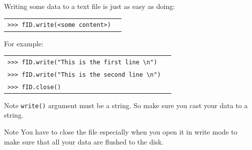 \documentclass[t,handout,9pt]{beamer}
\begin{document}
\begin{frame}
\vfill
Writing some data to a text file is just as easy as doing:
\begin{table}[]
\begin{flushleft}
\begin{tabular}{ll}
\texttt{>{}>{}> fID.write(<some content>)} &  \\
\end{tabular}
\end{flushleft}
\end{table}
For example:
\begin{table}[]
\begin{flushleft}
\begin{tabular}{ll}
\texttt{>{}>{}> fID.write("This is the first line \textbackslash n")} &  \\
\texttt{>{}>{}> fID.write("This is the second line \textbackslash n")} &  \\
\texttt{>{}>{}> fID.close()} &  \\
\end{tabular}
\end{flushleft}
\end{table}
\vfill
\begin{block}{Note}
\texttt{write()} argument must be a string. So make sure you cast your data to a string.
\end{block}
\begin{block}{Note}
You have to close the file especially when you open it in write mode to make sure that all your data are flushed to the disk.
\end{block}
\vfill
\end{frame}
%
\end{document}

